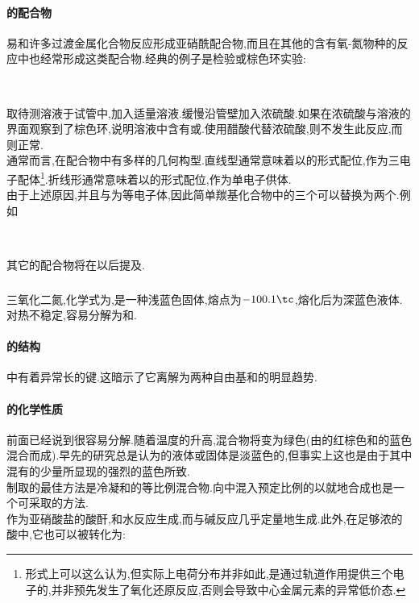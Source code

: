 \documentclass{ctexart}
\begin{document}
\paragraph{的配合物}
易和许多过渡金属化合物反应形成亚硝酰配合物,而且在其他的含有氧-氮物种的反应中也经常形成这类配合物.经典的例子是检验或棕色环实验:
\begin{center}
    \\
\end{center}
取待测溶液于试管中,加入适量溶液.缓慢沿管壁加入浓硫酸.如果在浓硫酸与溶液的界面观察到了棕色环,说明溶液中含有或.使用醋酸代替浓硫酸,则不发生此反应,而则正常.\\
\indent 通常而言,在配合物中有多样的几何构型.直线型通常意味着以的形式配位,作为三电子配体\footnote{形式上可以这么认为,但实际上电荷分布并非如此,是通过轨道作用提供三个电子的,并非预先发生了氧化还原反应,否则会导致中心金属元素的异常低价态.}.折线形通常意味着以的形式配位,作为单电子供体.\\
\indent 由于上述原因,并且与为等电子体,因此简单羰基化合物中的三个可以替换为两个.例如
\begin{center}
    \\
\end{center}
其它的配合物将在以后提及.
\subsubsection{}
\begin{substance}[\ce{N2O3}]
    三氧化二氮,化学式为,是一种浅蓝色固体,熔点为$-100.1\tc$,熔化后为深蓝色液体.对热不稳定,容易分解为和.
\end{substance}
\paragraph{的结构}
中有着异常长的键.这暗示了它离解为两种自由基和的明显趋势.
\paragraph{的化学性质}
前面已经说到很容易分解.随着温度的升高,混合物将变为绿色(由的红棕色和的蓝色混合而成).早先的研究总是认为的液体或固体是淡蓝色的,但事实上这也是由于其中混有的少量所显现的强烈的蓝色所致.\\
\indent 制取的最佳方法是冷凝和的等比例混合物.向中混入预定比例的以就地合成也是一个可采取的方法.\\
\indent 作为亚硝酸盐的酸酐,和水反应生成,而与碱反应几乎定量地生成.此外,在足够浓的酸中,它也可以被转化为:
\begin{center}
\end{center}
\end{document}
